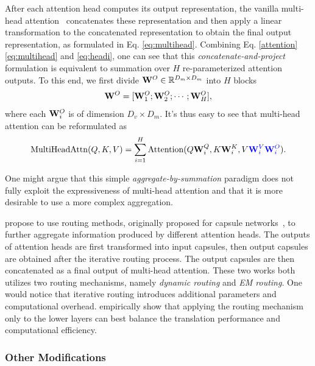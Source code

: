\documentclass[manuscript,acmsmall,screen,nonacm]{acmart}
\theoremstyle{definition}
\begin{document}
After each attention head computes its output representation, the vanilla multi-head attention~\cite{vaswani2017attention} concatenates these representation and then apply a linear transformation to the concatenated representation to obtain the final output representation, as formulated in Eq. \eqref{eq:multihead}. Combining Eq. \eqref{attention}\eqref{eq:multihead} and \eqref{eq:headi}, one can see that this \textit{concatenate-and-project} formulation is equivalent to summation over $H$ re-parameterized attention outputs. To this end, we first divide $\mathbf{W}^O\in\mathbb{R}^{D_m\times D_m}$ into $H$ blocks
\begin{equation}
    \mathbf{W}^O=[\mathbf{W}_1^O;\mathbf{W}_2^O;\cdots;\mathbf{W}_H^O],
\end{equation}
where each $\mathbf{W}_i^O$ is of dimension $D_v\times D_m$. It's thus easy to see that multi-head attention can be reformulated as
\begin{equation}
    \mathrm{MultiHeadAttn}(Q,K,V)= \sum_{i=1}^H \mathrm{Attention}(Q \bW_i^Q,K \bW_i^K, V\textcolor[rgb]{0,0,1} {\bW_i^V\bW_i^O}).
\end{equation}

One might argue that this simple \textit{aggregate-by-summation} paradigm does not fully exploit the expressiveness of multi-head attention and that it is more desirable to use a more complex aggregation.

\citet{li-etal-2019-multiheadrout,gu19capsule} propose to use routing methods, originally proposed for capsule networks~\cite{sabour17dynamicrouting}, to further aggregate information produced by different attention heads. The outputs of attention heads are first transformed into input capsules, then output capsules are obtained after the iterative routing process. The output capsules are then concatenated as a final output of multi-head attention. These two works both utilizes two routing mechanisms, namely \textit{dynamic routing}\cite{sabour17dynamicrouting} and \textit{EM routing}\cite{hinton18emrouting}. One would notice that iterative routing introduces additional parameters and computational overhead. \citet{li-etal-2019-multiheadrout} empirically show that applying the routing mechanism only to the lower layers can best balance the translation performance and computational efficiency.

\subsubsection{Other Modifications}
\end{document}

